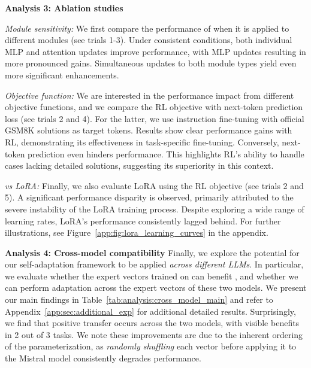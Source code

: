 \textbf{Analysis 3: Ablation studies}

\label{app:sec:ablation_studies}

\textit{Module sensitivity:} We first compare the performance of \svdacro when it is applied to different modules (see trials 1-3).
Under consistent conditions, both individual MLP and attention updates improve performance, with MLP updates resulting in more pronounced gains.
Simultaneous updates to both module types yield even more significant enhancements.

\textit{Objective function:} We are interested in the performance impact from different objective functions, and we compare the RL objective with next-token prediction loss (see trials 2 and 4).
For the latter, we use instruction fine-tuning with official GSM8K solutions as target tokens.
Results show clear performance gains with RL, demonstrating its effectiveness in task-specific fine-tuning.
Conversely, next-token prediction even hinders performance.
This highlights RL's ability to handle cases lacking detailed solutions, suggesting its superiority in this context.

\textit{\svdacro vs LoRA:} Finally, we also evaluate LoRA using the RL objective (see trials 2 and 5).
A significant performance disparity is observed, primarily attributed to the severe instability of the LoRA training process.
Despite exploring a wide range of learning rates, LoRA's performance consistently lagged behind.
For further illustrations, see Figure~\ref{app:fig:lora_learning_curves} in the appendix.


\textbf{Analysis 4: Cross-model compatibility}
Finally, we explore the potential for our self-adaptation framework to be applied \textit{across different LLMs}.  In particular, we evaluate whether the \svdacro expert vectors trained on \llama can benefit \mistral, and whether we can perform adaptation across the expert vectors of these two models. We present our main findings in Table~\ref{tab:analysis:cross_model_main} and refer to Appendix~\ref{app:sec:additional_exp} for additional detailed results. 
Surprisingly, we find that positive transfer occurs across the two models, with visible benefits in 2 out of 3 tasks.
We note these improvements are due to the inherent ordering of the \svdacro parameterization, as \textit{randomly shuffling} each \svdacro vector before applying it to the Mistral model consistently degrades performance.


